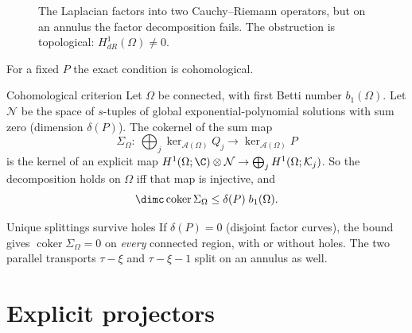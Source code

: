 \begin{figure}[!htb]
\centering
{}
\caption{The Laplacian factors into two Cauchy--Riemann operators, but on an annulus the factor decomposition fails. The obstruction is topological: $H^1_{dR}(\Omega)\neq0$.}\label{fig:hole}
\end{figure}

For a fixed $P$ the exact condition is cohomological.

\begin{theorem}{Cohomological criterion  \pw}\label{thm:cohom}
Let $\Omega$ be connected, with first Betti number $b_1(\Omega)$. Let $\mathcal N$ be the space of $s$-tuples of global exponential-polynomial solutions with sum zero (dimension $\delta(P)$). The cokernel of the sum map
\[
\Sigma_\Omega:\ \bigoplus_j\ker_{\mathcal A(\Omega)}Q_j\to\ker_{\mathcal A(\Omega)}P
\]
is the kernel of an explicit map $H^1(\Omega;\C)\otimes\mathcal N\to\bigoplus_jH^1(\Omega;\mathcal K_j)$. So the decomposition holds on $\Omega$ iff that map is injective, and
\[
\dimc\operatorname{coker}\Sigma_\Omega\le\delta(P)\;b_1(\Omega).
\]
\end{theorem}

\begin{example}{Unique splittings survive holes}
If $\delta(P)=0$ (disjoint factor curves), the bound gives $\operatorname{coker}\Sigma_\Omega=0$ on \emph{every} connected region, with or without holes. The two parallel transports $\tau-\xi$ and $\tau-\xi-1$ split on an annulus as well.
\end{example}

\section{Explicit projectors}

